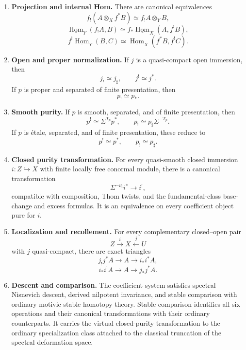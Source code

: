 \begin{theorem}
\begin{enumerate}
    \item \textbf{Projection and internal Hom.}
    There are canonical equivalences
    \[
        f_!(A\otimes_Xf^*B)
        \simeq
        f_!A\otimes_YB,
    \]
    \[
        \underline{\operatorname{Hom}}_Y(f_!A,B)
        \simeq
        f_*\underline{\operatorname{Hom}}_X(A,f^!B),
    \]
    \[
        f^!\underline{\operatorname{Hom}}_Y(B,C)
        \simeq
        \underline{\operatorname{Hom}}_X(f^*B,f^!C).
    \]

    \item \textbf{Open and proper normalization.}
    If \(j\) is a quasi-compact open immersion, then
    \[
        j_!\simeq j_\sharp,
        \qquad
        j^!\simeq j^*.
    \]
    If \(p\) is proper and separated of finite presentation, then
    \[
        p_!\simeq p_*.
    \]

    \item \textbf{Smooth purity.}
    If \(p\) is smooth, separated, and of finite presentation, then
    \[
        p^!
        \simeq
        \Sigma^{T_p}p^*,
        \qquad
        p_!
        \simeq
        p_\sharp\Sigma^{-T_p}.
    \]
    If \(p\) is \'{e}tale, separated, and of finite presentation, these reduce to
    \[
        p^!\simeq p^*,
        \qquad
        p_!\simeq p_\sharp.
    \]

    \item \textbf{Closed purity transformation.}
    For every quasi-smooth closed immersion \(i:Z\hookrightarrow X\) with
    finite locally free conormal module, there is a canonical transformation
    \[
        \Sigma^{-\nu_i}i^*
        \longrightarrow
        i^!,
    \]
    compatible with composition, Thom twists, and the fundamental-class
    base-change and excess formulas.  It is an
    equivalence on every coefficient object pure for \(i\).

    \item \textbf{Localization and recollement.}
    For every complementary closed--open pair
    \[
        Z\xrightarrow{i}X\xleftarrow{j}U
    \]
    with \(j\) quasi-compact, there are exact triangles
    \[
        j_!j^*A
        \longrightarrow
        A
        \longrightarrow
        i_*i^*A,
    \]
    \[
        i_*i^!A
        \longrightarrow
        A
        \longrightarrow
        j_*j^*A.
    \]

    \item \textbf{Descent and comparison.}
    The coefficient system satisfies spectral Nisnevich descent, derived
    nilpotent invariance, and stable comparison with ordinary motivic stable
    homotopy theory.  Stable comparison identifies all six operations and
    their canonical transformations with their ordinary counterparts.  It
    carries the virtual closed-purity transformation to the ordinary
    specialization class attached to the classical truncation of the
    spectral deformation space.


\end{enumerate}
\end{theorem}
